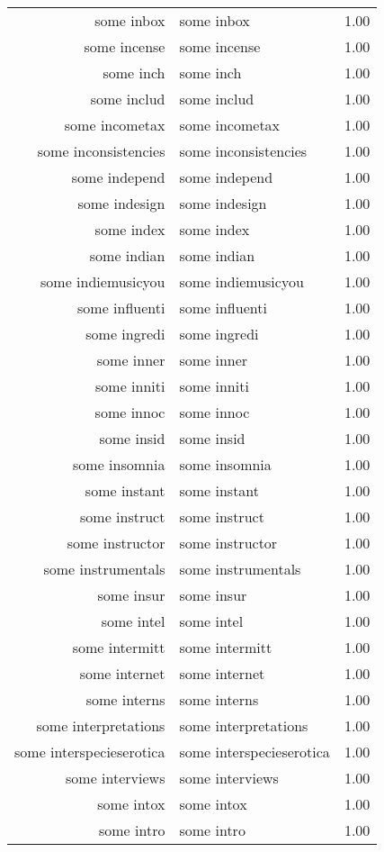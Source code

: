\begin{table}[ht]
\begin{tabular}{rlr}
  some inbox & some inbox & 1.00 \\ 
  some incense & some incense & 1.00 \\ 
  some inch & some inch & 1.00 \\ 
  some includ & some includ & 1.00 \\ 
  some incometax & some incometax & 1.00 \\ 
  some inconsistencies & some inconsistencies & 1.00 \\ 
  some independ & some independ & 1.00 \\ 
  some indesign & some indesign & 1.00 \\ 
  some index & some index & 1.00 \\ 
  some indian & some indian & 1.00 \\ 
  some indiemusicyou & some indiemusicyou & 1.00 \\ 
  some influenti & some influenti & 1.00 \\ 
  some ingredi & some ingredi & 1.00 \\ 
  some inner & some inner & 1.00 \\ 
  some inniti & some inniti & 1.00 \\ 
  some innoc & some innoc & 1.00 \\ 
  some insid & some insid & 1.00 \\ 
  some insomnia & some insomnia & 1.00 \\ 
  some instant & some instant & 1.00 \\ 
  some instruct & some instruct & 1.00 \\ 
  some instructor & some instructor & 1.00 \\ 
  some instrumentals & some instrumentals & 1.00 \\ 
  some insur & some insur & 1.00 \\ 
  some intel & some intel & 1.00 \\ 
  some intermitt & some intermitt & 1.00 \\ 
  some internet & some internet & 1.00 \\ 
  some interns & some interns & 1.00 \\ 
  some interpretations & some interpretations & 1.00 \\ 
  some interspecieserotica & some interspecieserotica & 1.00 \\ 
  some interviews & some interviews & 1.00 \\ 
  some intox & some intox & 1.00 \\ 
  some intro & some intro & 1.00 \\ 

\end{tabular}
\end{table}
